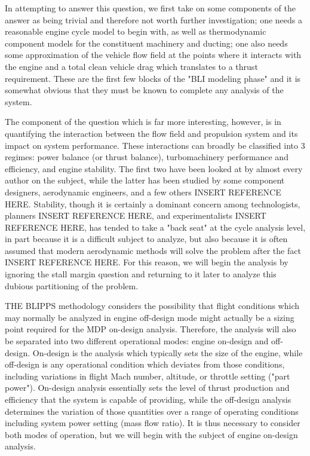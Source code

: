 			In attempting to answer this question, we first take on some components of the answer as being trivial and therefore not worth further investigation; one needs a reasonable engine cycle model to begin with, as well as thermodynamic component models for the constituent machinery and ducting;  one also needs some approximation of the vehicle flow field at the points where it interacts with the engine and a total clean vehicle drag which translates to a thrust requirement.  These are the first few blocks of the "BLI modeling phase" and it is somewhat obvious that they must be known to complete any analysis of the system.  
			
			The component of the question which is far more interesting, however, is in quantifying the interaction between the flow field and propulsion system and its impact on system performance.  These interactions can broadly be classified into 3 regimes: power balance (or thrust balance), turbomachinery performance and efficiency, and engine stability.  The first two have been looked at by almost every author on the subject, while the latter has been studied by some component designers, aerodynamic engineers, and a few others INSERT REFERENCE HERE.  Stability, though it is certainly a dominant concern among technologists, planners INSERT REFERENCE HERE, and experimentalists INSERT REFERENCE HERE, has tended to take a "back seat" at the cycle analysis level, in part because it is a difficult subject to analyze, but also because it is often assumed that modern aerodynamic methods will solve the problem after the fact INSERT REFERENCE HERE.  For this reason, we will begin the analysis by ignoring the stall margin question and returning to it later to analyze this dubious partitioning of the problem.
			
			THE BLIPPS methodology considers the possibility that flight conditions which may normally be analyzed in engine off-design mode might actually be a sizing point required for the MDP on-design analysis.  Therefore, the analysis will also be separated into two different operational modes: engine on-design and off-design.  On-design is the analysis which typically sets the size of the engine, while off-design is any operational condition which deviates from those conditions, including variations in flight Mach number, altitude, or throttle setting ("part power").  On-design analysis essentially sets the level of thrust production and efficiency that the system is capable of providing, while the off-design analysis determines the variation of those quantities over a range of operating conditions including system power setting (mass flow ratio).  It is thus necessary to consider both modes of operation, but we will begin with the subject of engine on-design analysis.	
			
